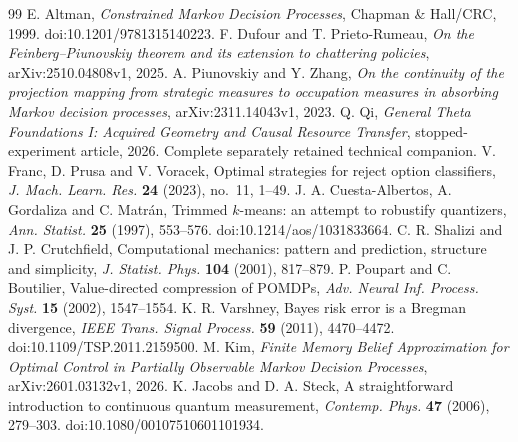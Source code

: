 \begin{thebibliography}{99}
 E. Altman, \emph{Constrained Markov Decision Processes}, Chapman \& Hall/CRC, 1999. doi:10.1201/9781315140223.
 F. Dufour and T. Prieto-Rumeau, \emph{On the Feinberg--Piunovskiy theorem and its extension to chattering policies}, arXiv:2510.04808v1, 2025.
 A. Piunovskiy and Y. Zhang, \emph{On the continuity of the projection mapping from strategic measures to occupation measures in absorbing Markov decision processes}, arXiv:2311.14043v1, 2023.
 Q. Qi, \emph{General Theta Foundations I: Acquired Geometry and Causal Resource Transfer}, stopped-experiment article, 2026. Complete separately retained technical companion.
 V. Franc, D. Prusa and V. Voracek, Optimal strategies for reject option classifiers, \emph{J. Mach. Learn. Res.} \textbf{24} (2023), no.~11, 1--49.
 J. A. Cuesta-Albertos, A. Gordaliza and C. Matr\'an, Trimmed $k$-means: an attempt to robustify quantizers, \emph{Ann. Statist.} \textbf{25} (1997), 553--576. doi:10.1214/aos/1031833664.
 C. R. Shalizi and J. P. Crutchfield, Computational mechanics: pattern and prediction, structure and simplicity, \emph{J. Statist. Phys.} \textbf{104} (2001), 817--879.
 P. Poupart and C. Boutilier, Value-directed compression of POMDPs, \emph{Adv. Neural Inf. Process. Syst.} \textbf{15} (2002), 1547--1554.
 K. R. Varshney, Bayes risk error is a Bregman divergence, \emph{IEEE Trans. Signal Process.} \textbf{59} (2011), 4470--4472. doi:10.1109/TSP.2011.2159500.
 M. Kim, \emph{Finite Memory Belief Approximation for Optimal Control in Partially Observable Markov Decision Processes}, arXiv:2601.03132v1, 2026.
 K. Jacobs and D. A. Steck, A straightforward introduction to continuous quantum measurement, \emph{Contemp. Phys.} \textbf{47} (2006), 279--303. doi:10.1080/00107510601101934.
\end{thebibliography}

